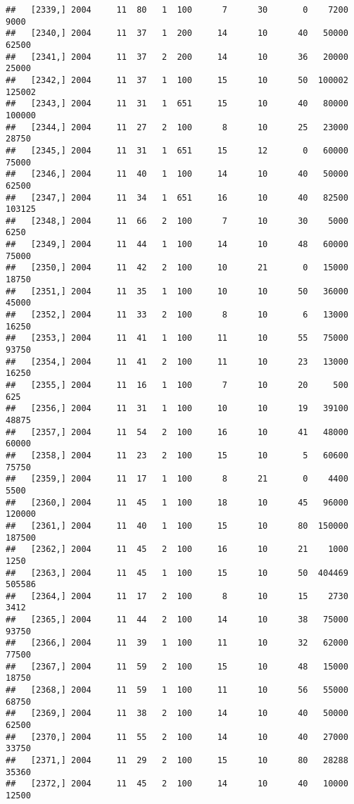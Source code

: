 \documentclass{article}\usepackage[]{graphicx}\usepackage[]{color}
\makeatletter
\newenvironment{kframe}{%
 \def\at@end@of@kframe{}%
 \ifinner\ifhmode%
  \def\at@end@of@kframe{\end{minipage}}%
  \begin{minipage}{\columnwidth}%
 \fi\fi%
 \def\FrameCommand##1{\hskip\@totalleftmargin \hskip-\fboxsep
 \colorbox{shadecolor}{##1}\hskip-\fboxsep
     \hskip-\linewidth \hskip-\@totalleftmargin \hskip\columnwidth}%
 \MakeFramed {\advance\hsize-\width
   \@totalleftmargin\z@ \linewidth\hsize
   \@setminipage}}%
 {\par\unskip\endMakeFramed%
 \at@end@of@kframe}
\newenvironment{knitrout}{}{} %
\makeatother
\begin{document}
\begin{knitrout}
\begin{kframe}
\begin{verbatim}
##   [2339,] 2004     11  80   1  100      7      30       0    7200    9000
##   [2340,] 2004     11  37   1  200     14      10      40   50000   62500
##   [2341,] 2004     11  37   2  200     14      10      36   20000   25000
##   [2342,] 2004     11  37   1  100     15      10      50  100002  125002
##   [2343,] 2004     11  31   1  651     15      10      40   80000  100000
##   [2344,] 2004     11  27   2  100      8      10      25   23000   28750
##   [2345,] 2004     11  31   1  651     15      12       0   60000   75000
##   [2346,] 2004     11  40   1  100     14      10      40   50000   62500
##   [2347,] 2004     11  34   1  651     16      10      40   82500  103125
##   [2348,] 2004     11  66   2  100      7      10      30    5000    6250
##   [2349,] 2004     11  44   1  100     14      10      48   60000   75000
##   [2350,] 2004     11  42   2  100     10      21       0   15000   18750
##   [2351,] 2004     11  35   1  100     10      10      50   36000   45000
##   [2352,] 2004     11  33   2  100      8      10       6   13000   16250
##   [2353,] 2004     11  41   1  100     11      10      55   75000   93750
##   [2354,] 2004     11  41   2  100     11      10      23   13000   16250
##   [2355,] 2004     11  16   1  100      7      10      20     500     625
##   [2356,] 2004     11  31   1  100     10      10      19   39100   48875
##   [2357,] 2004     11  54   2  100     16      10      41   48000   60000
##   [2358,] 2004     11  23   2  100     15      10       5   60600   75750
##   [2359,] 2004     11  17   1  100      8      21       0    4400    5500
##   [2360,] 2004     11  45   1  100     18      10      45   96000  120000
##   [2361,] 2004     11  40   1  100     15      10      80  150000  187500
##   [2362,] 2004     11  45   2  100     16      10      21    1000    1250
##   [2363,] 2004     11  45   1  100     15      10      50  404469  505586
##   [2364,] 2004     11  17   2  100      8      10      15    2730    3412
##   [2365,] 2004     11  44   2  100     14      10      38   75000   93750
##   [2366,] 2004     11  39   1  100     11      10      32   62000   77500
##   [2367,] 2004     11  59   2  100     15      10      48   15000   18750
##   [2368,] 2004     11  59   1  100     11      10      56   55000   68750
##   [2369,] 2004     11  38   2  100     14      10      40   50000   62500
##   [2370,] 2004     11  55   2  100     14      10      40   27000   33750
##   [2371,] 2004     11  29   2  100     15      10      80   28288   35360
##   [2372,] 2004     11  45   2  100     14      10      40   10000   12500

\end{verbatim}
\end{kframe}
\end{knitrout}
\end{document}
